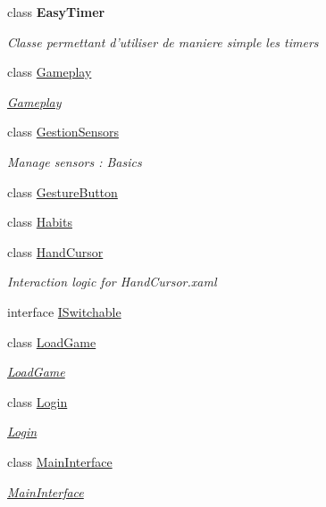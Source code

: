\begin{DoxyCompactItemize}
class {\bfseries Easy\+Timer}
\begin{DoxyCompactList}\small\item\em Classe permettant d'utiliser de maniere simple les timers \end{DoxyCompactList}\item 
class \hyperlink{class_w_p_f_page_switch_1_1_gameplay}{Gameplay}
\begin{DoxyCompactList}\small\item\em \hyperlink{class_w_p_f_page_switch_1_1_gameplay}{Gameplay} \end{DoxyCompactList}\item 
class \hyperlink{class_w_p_f_page_switch_1_1_gestion_sensors}{Gestion\+Sensors}
\begin{DoxyCompactList}\small\item\em Manage sensors \+: Basics \end{DoxyCompactList}\item 
class \hyperlink{class_w_p_f_page_switch_1_1_gesture_button}{Gesture\+Button}
\item 
class \hyperlink{class_w_p_f_page_switch_1_1_habits}{Habits}
\item 
class \hyperlink{class_w_p_f_page_switch_1_1_hand_cursor}{Hand\+Cursor}
\begin{DoxyCompactList}\small\item\em Interaction logic for Hand\+Cursor.\+xaml \end{DoxyCompactList}\item 
interface \hyperlink{interface_w_p_f_page_switch_1_1_i_switchable}{I\+Switchable}
\item 
class \hyperlink{class_w_p_f_page_switch_1_1_load_game}{Load\+Game}
\begin{DoxyCompactList}\small\item\em \hyperlink{class_w_p_f_page_switch_1_1_load_game}{Load\+Game} \end{DoxyCompactList}\item 
class \hyperlink{class_w_p_f_page_switch_1_1_login}{Login}
\begin{DoxyCompactList}\small\item\em \hyperlink{class_w_p_f_page_switch_1_1_login}{Login} \end{DoxyCompactList}\item 
class \hyperlink{class_w_p_f_page_switch_1_1_main_interface}{Main\+Interface}
\begin{DoxyCompactList}\small\item\em \hyperlink{class_w_p_f_page_switch_1_1_main_interface}{Main\+Interface} \end{DoxyCompactList}\item 

\end{DoxyCompactItemize}
